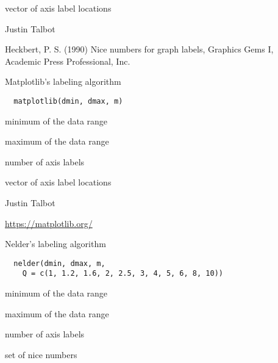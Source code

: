 \documentclass[letterpaper]{book}
\begin{document}
%
\begin{Value}
vector of axis label locations
\end{Value}
%
\begin{Author}\relax
Justin Talbot 
\end{Author}
%
\begin{References}\relax
Heckbert, P. S. (1990) Nice numbers for graph labels,
Graphics Gems I, Academic Press Professional, Inc.
\end{References}
%
\begin{Description}\relax
Matplotlib's labeling algorithm
\end{Description}
%
\begin{Usage}
\begin{verbatim}
  matplotlib(dmin, dmax, m)
\end{verbatim}
\end{Usage}
%
\begin{Arguments}
\begin{ldescription}
\item[\code{dmin}] minimum of the data range

\item[\code{dmax}] maximum of the data range

\item[\code{m}] number of axis labels
\end{ldescription}
\end{Arguments}
%
\begin{Value}
vector of axis label locations
\end{Value}
%
\begin{Author}\relax
Justin Talbot 
\end{Author}
%
\begin{References}\relax
\url{https://matplotlib.org/}
\end{References}
%
\begin{Description}\relax
Nelder's labeling algorithm
\end{Description}
%
\begin{Usage}
\begin{verbatim}
  nelder(dmin, dmax, m,
    Q = c(1, 1.2, 1.6, 2, 2.5, 3, 4, 5, 6, 8, 10))
\end{verbatim}
\end{Usage}
%
\begin{Arguments}
\begin{ldescription}
\item[\code{dmin}] minimum of the data range

\item[\code{dmax}] maximum of the data range

\item[\code{m}] number of axis labels

\item[\code{Q}] set of nice numbers
\end{ldescription}
\end{Arguments}
\end{document}
